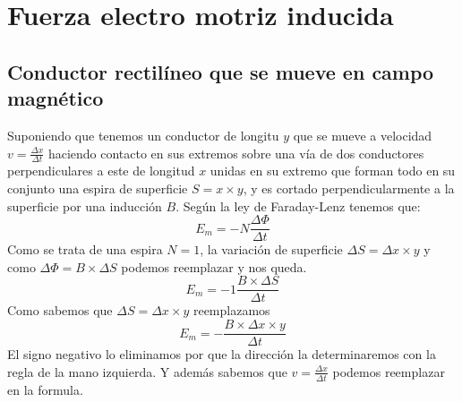 \documentclass[../main]{subfiles}
\begin{document}
\chapter{Fuerza electro motriz inducida}
\section{Conductor rectilíneo que se mueve en campo magnético}
 \begin{center}
 \end{center}

Suponiendo que tenemos un conductor de longitu $y$ que se mueve a velocidad $v=\frac{\Delta x}{\Delta t}$ haciendo contacto en sus extremos sobre una vía de dos conductores perpendiculares a este de longitud $x$ unidas en su extremo que forman todo en su conjunto una espira de superficie $S=x \times y$, y es cortado perpendicularmente a la superficie por una inducción $B$. Según la ley de Faraday-Lenz tenemos que: 
\begin{equation}
    E_m= -N \dfrac{ \Delta \Phi}{\Delta t}
\end{equation}
Como se trata de una espira $N=1$, la variación de superficie 
$\Delta S =\Delta x \times y$ y como $\Delta \Phi=B \times \Delta S $ podemos reemplazar y nos queda.
\begin{equation}
    E_m= -1 \dfrac{ B \times \Delta S}{\Delta t}
\end{equation}
Como sabemos que $\Delta S =\Delta x \times y$ reemplazamos
\begin{equation}
    E_m= - \dfrac{ B \times \Delta x \times y}{\Delta t}
\end{equation}
El signo negativo lo eliminamos por que la dirección la determinaremos con la regla de la mano izquierda. Y además sabemos que $v=\frac{\Delta x}{\Delta t}$ podemos reemplazar en la formula.
\end{document}
